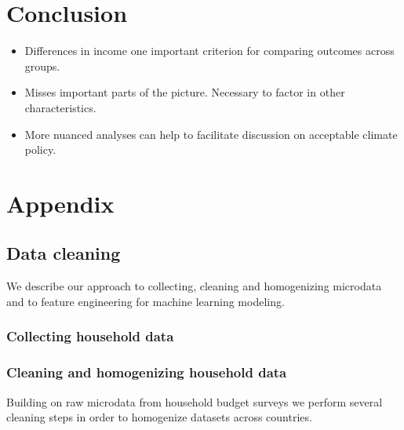\documentclass[12pt, a4paper]{article}
\begin{document}
\section{Conclusion} \label{sec:conclusion}

\begin{itemize}
 \item Differences in income one important criterion for comparing outcomes across groups.
 \item Misses important parts of the picture. Necessary to factor in other characteristics.
 \item More nuanced analyses can help to facilitate discussion on acceptable climate policy.
\end{itemize}

\clearpage

\printbibliography

\clearpage

\appendix

\section{Appendix} \label{sec:appendix}

\subsection{Data cleaning} \label{sec:cleaning}

We describe our approach to collecting, cleaning and homogenizing microdata and to feature engineering for machine learning modeling.

\subsubsection{Collecting household data}



\subsubsection{Cleaning and homogenizing household data}

Building on raw microdata from household budget surveys we perform several cleaning steps in order to homogenize datasets across countries.
\end{document}
